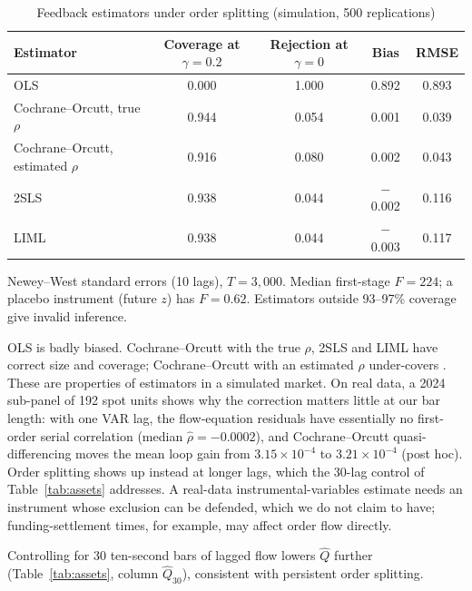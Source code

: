 \documentclass[12pt]{article}
\theoremstyle{definition}
\theoremstyle{remark}
\begin{document}
\begin{table}[t]\centering
\begin{threeparttable}
\caption{Feedback estimators under order splitting (simulation, 500 replications)}\label{tab:iv}
\begin{tabular}{lcccc}
\toprule
Estimator & Coverage at $\gamma=0.2$ & Rejection at $\gamma=0$ & Bias & RMSE\\
\midrule
OLS & 0.000 & 1.000 & 0.892 & 0.893\\
Cochrane--Orcutt, true $\rho$ & 0.944 & 0.054 & 0.001 & 0.039\\
Cochrane--Orcutt, estimated $\rho$ & 0.916 & 0.080 & 0.002 & 0.043\\
2SLS & 0.938 & 0.044 & $-$0.002 & 0.116\\
LIML & 0.938 & 0.044 & $-$0.003 & 0.117\\
\bottomrule
\end{tabular}
\begin{tablenotes}\footnotesize\item Newey--West standard errors (10 lags), $T=3{,}000$. Median first-stage $F=224$; a placebo instrument (future $z$) has $F=0.62$. Estimators outside 93--97\% coverage give invalid inference. \end{tablenotes}
\end{threeparttable}
\end{table}

OLS is badly biased. Cochrane--Orcutt with the true $\rho$, 2SLS and LIML have correct size and coverage; Cochrane--Orcutt with an estimated $\rho$ under-covers \citep{cochrane1949,staiger1997}. These are properties of estimators in a simulated market. On real data, a 2024 sub-panel of 192 spot units shows why the correction matters little at our bar length: with one VAR lag, the flow-equation residuals have essentially no first-order serial correlation (median $\hat\rho=-0.0002$), and Cochrane--Orcutt quasi-differencing moves the mean loop gain from $3.15\times10^{-4}$ to $3.21\times10^{-4}$ (post hoc). Order splitting shows up instead at longer lags, which the 30-lag control of Table~\ref{tab:assets} addresses. A real-data instrumental-variables estimate needs an instrument whose exclusion can be defended, which we do not claim to have; funding-settlement times, for example, may affect order flow directly.

Controlling for 30 ten-second bars of lagged flow lowers $\hat Q$ further (Table~\ref{tab:assets}, column $\hat Q_{30}$), consistent with persistent order splitting.
\end{document}
